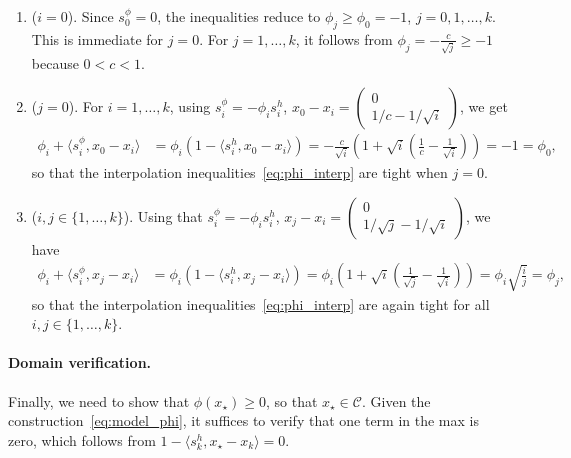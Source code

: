 \documentclass[a4paper]{article}
\renewcommand{\geq}{\geqslant}
\newcommand{\CC}{\mathcal{C}}
\newcommand{\ip}[2]{\langle #1, #2\rangle}
\begin{document}
\begin{enumerate}[label=($\phi$.\roman{*})]
        \item (\(i=0\)).
        Since \(s_0^\phi=0\), the inequalities reduce to
        $\phi_j\geq\phi_0=-1$, $j=0,1,\ldots,k$.
        This is immediate for \(j=0\).
        For \(j=1,\ldots,k\), it follows from $\phi_j=-\tfrac{c}{\sqrt j}\geq -1$ because \(0<c<1\).

        \item (\(j=0\)).
		For \(i=1,\ldots,k\), using \(s_i^\phi=-\phi_i s_i^h\), $x_0-x_i =         \begin{pmatrix}
        0\\
        1/c - 1/\sqrt i
        \end{pmatrix}$, 
       	we get
        \begin{align*}
			\phi_i+\ip{s_i^\phi}{x_0-x_i} &=           
                \phi_i
                \left(
                1-\ip{s_i^h}{x_0-x_i}
                \right)
                =
                -\tfrac{c}{\sqrt i}
                \left(
                1 + \sqrt{i}\left(\tfrac{1}{c} - \tfrac{1}{\sqrt i}\right) 
                                \right)
               = -1 = \phi_0,      
        \end{align*}
      so that  the interpolation inequalities~\eqref{eq:phi_interp} are tight when $j=0$.
        
              \item (\(i,j\in\{1,\ldots,k\}\)).
		Using that \(s_i^\phi=-\phi_i s_i^h\), $x_j-x_i =         \begin{pmatrix}
        0\\
        1/\sqrt j - 1/\sqrt i
        \end{pmatrix}$, 
                we have
                \begin{align*}
                  \phi_i+\ip{s_i^\phi}{x_j-x_i} &= \phi_i \left(1 -\ip{s_i^h}{x_j-x_i}\right) = \phi_i \left(1 +\sqrt{i}\left(\tfrac{1}{\sqrt{j}} - \tfrac{1}{\sqrt i} \right)\right) = \phi_i \sqrt{\tfrac{i}{j}} = \phi_j,
                \end{align*}
		so that the interpolation inequalities~\eqref{eq:phi_interp} are again tight for all $i,j\in\{1,\ldots,k\}$.
\end{enumerate}

\paragraph{Domain verification.}
Finally, we need to show that $\phi(x_\star)\geq 0$, so that $x_\star\in\CC$.
Given the construction~\eqref{eq:model_phi}, it suffices to verify that one term in the max is zero, which follows from $1-\ip{s_k^{h}}{x_\star-x_k}=0$.
\end{document}
